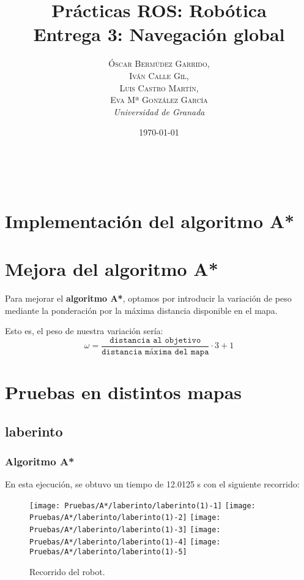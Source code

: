 \documentclass[a4paper, 11pt]{article}
\title{\textbf{Prácticas ROS: Robótica}\\ %
Entrega 3: Navegación global} %
\author{\textsc{Óscar Bermúdez Garrido,\\Iván Calle Gil,\\ Luis Castro Martín,\\ Eva Mª González García} %
\\{\textit{Universidad de Granada}}} %
\date{\today} %
\makeatletter
\renewcommand{\maketitle}{
  \begin{flushright} %
  
  {\LARGE\@title} %
  
  \vspace{50pt} %
  
  {\large\@author} %
  \\\@date %
  \vspace{40pt} %
  \end{flushright}
}
\makeatother
\begin{document}
\maketitle %

\renewcommand{\abstractname}{Resumen} %
\begin{abstract}

\end{abstract}


{\parskip=2pt
  \tableofcontents
}
\pagebreak


\section{Implementación del algoritmo A*}
	

\section{Mejora del algoritmo A*}
	Para mejorar el \textbf{algoritmo A*}, optamos por introducir la variación de peso mediante la
	ponderación por la máxima distancia disponible en el mapa.
	
	Esto es, el peso de nuestra variación sería:
	$$\omega = \frac{\texttt{distancia al objetivo}}{\texttt{distancia máxima del mapa}} \cdot 3 + 1$$

\section{Pruebas en distintos mapas}
	\subsection{laberinto}
		\subsubsection{Algoritmo A*}
			En esta ejecución, se obtuvo un tiempo de 12.0125 s con el siguiente recorrido:
			\begin{figure}[H]
				\centering
				\texttt{[image: Pruebas/A*/laberinto/laberinto(1)-1]}
				\texttt{[image: Pruebas/A*/laberinto/laberinto(1)-2]}
				\texttt{[image: Pruebas/A*/laberinto/laberinto(1)-3]}
				\texttt{[image: Pruebas/A*/laberinto/laberinto(1)-4]}
				\texttt{[image: Pruebas/A*/laberinto/laberinto(1)-5]}
				\caption{Recorrido del robot.}
				\label{A-lab}
			\end{figure}
			
\end{document}
